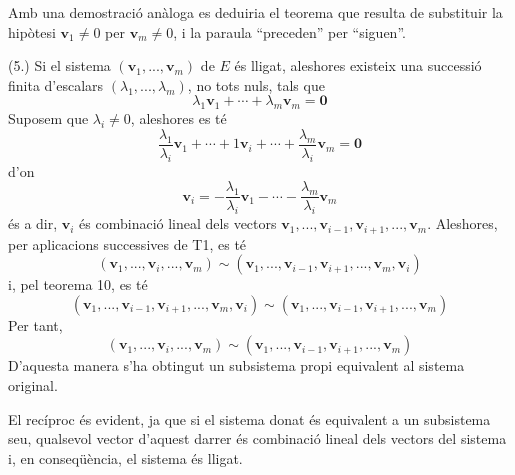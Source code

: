 \begin{prova}
Amb una demostració anàloga es deduiria el teorema que
resulta de substituir la hipòtesi $\mathbf{v}_{1}\neq 0$ per $\mathbf{v}%
_{m}\neq 0$, i la paraula ``preceden'' per ``siguen''.

(5.) Si el sistema $(\mathbf{v}_{1},...,\mathbf{v}_{m})$ de $E$ és
lligat, aleshores existeix una successió finita d'escalars $\left( \lambda
_{1},...,\lambda _{m}\right) $, no tots nuls, tals que%
\begin{equation*}
\lambda _{1}\mathbf{v}_{1}+\cdots +\lambda _{m}\mathbf{v}_{m}=\mathbf{0}
\end{equation*}%
Suposem que $\lambda _{i}\neq 0$, aleshores es té%
\begin{equation*}
\frac{\lambda _{1}}{\lambda _{i}}\mathbf{v}_{1}+\cdots +1\mathbf{v}%
_{i}+\cdots +\frac{\lambda _{m}}{\lambda _{i}}\mathbf{v}_{m}=\mathbf{0}
\end{equation*}%
d’on%
\begin{equation*}
\mathbf{v}_{i}=-\frac{\lambda _{1}}{\lambda _{i}}\mathbf{v}_{1}-\cdots -%
\frac{\lambda _{m}}{\lambda _{i}}\mathbf{v}_{m}
\end{equation*}%
és a dir, $\mathbf{v}_{i}$ és combinació lineal dels vectors $%
\mathbf{v}_{1},...,\mathbf{v}_{i-1},\mathbf{v}_{i+1},...,\mathbf{v}_{m}$.
Aleshores, per aplicacions successives de T1, es té%
\begin{equation*}
\left( \mathbf{v}_{1},...,\mathbf{v}_{i},...,\mathbf{v}_{m}\right) \sim
\left( \mathbf{v}_{1},...,\mathbf{v}_{i-1},\mathbf{v}_{i+1},...,\mathbf{v}%
_{m},\mathbf{v}_{i}\right)
\end{equation*}%
i, pel teorema 10, es té%
\begin{equation*}
\left( \mathbf{v}_{1},...,\mathbf{v}_{i-1},\mathbf{v}_{i+1},...,\mathbf{v}%
_{m},\mathbf{v}_{i}\right) \sim \left( \mathbf{v}_{1},...,\mathbf{v}_{i-1},%
\mathbf{v}_{i+1},...,\mathbf{v}_{m}\right)
\end{equation*}%
Per tant,%
\begin{equation*}
\left( \mathbf{v}_{1},...,\mathbf{v}_{i},...,\mathbf{v}_{m}\right) \sim
\left( \mathbf{v}_{1},...,\mathbf{v}_{i-1},\mathbf{v}_{i+1},...,\mathbf{v}%
_{m}\right)
\end{equation*}%
D'aquesta manera s'ha obtingut un subsistema propi equivalent al sistema
original.

El recíproc és evident, ja que si el sistema donat és equivalent a un
subsistema seu, qualsevol vector d’aquest darrer és combinació
lineal dels vectors del sistema i, en conseqüència, el sistema és lligat.
\end{prova}

